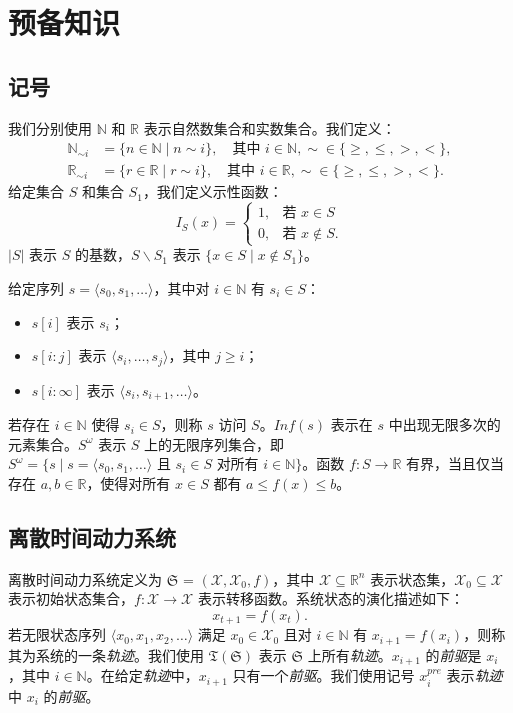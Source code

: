 ﻿\section{预备知识}
\subsection{记号}
\label{notation123}
我们分别使用 \(\mathbb{N}\) 和 \(\mathbb{R}\) 表示自然数集合和实数集合。我们定义：
\begin{align*}
  \mathbb{N}_{\sim i} &= \{n \in \mathbb{N} \mid n \sim i\}, \quad \text{其中 } i \in \mathbb{N}, \sim \in \{\geq, \leq, >, <\}, \\
  \mathbb{R}_{\sim i} &= \{r \in \mathbb{R} \mid r \sim i\}, \quad \text{其中 } i \in \mathbb{R}, \sim \in \{\geq, \leq, >, <\}.
\end{align*}
给定集合 \( S \) 和集合 $S_1$，我们定义示性函数：
$$I_S(x) =
  \begin{cases}
  1, & \text{若 } x \in S \\
  0, & \text{若 } x \not\in S.
  \end{cases}$$
$|S|$ 表示 $S$ 的基数，$S\backslash S_1$ 表示 $\{x \in S \mid x \not\in S_1\}$。

给定序列 \( s = \langle s_0, s_1, \dots \rangle \)，其中对 $i \in \mathbb{N}$ 有 $s_i \in S$：
\begin{itemize}
  \item \( s[i] \) 表示 \( s_i \)；
  \item \( s[i:j] \) 表示 \( \langle s_i, \dots, s_j \rangle \)，其中 \( j \geq i \)；
  \item \( s[i:\infty] \) 表示 \( \langle s_i, s_{i+1}, \dots \rangle \)。
\end{itemize}
若存在 $i \in \mathbb{N}$ 使得 $s_i \in S$，则称 $s$ 访问 $S$。$Inf(s)$ 表示在 $s$ 中出现无限多次的元素集合。$S^{\omega}$ 表示 $S$ 上的无限序列集合，即 $S^{\omega} = \{s \mid s=\langle s_0, s_1, \dots \rangle \text{ 且 } s_i \in S \text{ 对所有 } i \in \mathbb{N}\}$。函数 $f: S \rightarrow \mathbb{R}$ 有界，当且仅当存在 $a, b \in \mathbb{R}$，使得对所有 $x \in S$ 都有 $a \leq f(x) \leq b$。

\subsection{离散时间动力系统}
\label{dtds}
离散时间动力系统定义为 $\mathfrak{S}$ = $(\mathcal{X}, \mathcal{X}_0, f)$，其中 $\mathcal{X} \subseteq \mathbb{R}^n$ 表示状态集，$\mathcal{X}_{0} \subseteq \mathcal{X}$ 表示初始状态集合，$f: \mathcal{X} \rightarrow \mathcal{X}$ 表示转移函数。系统状态的演化描述如下：
\[
  x_{t+1} = f(x_t).
\]
若无限状态序列 $\langle x_0, x_1, x_2, \dots \rangle$ 满足 $x_0 \in \mathcal{X}_0$ 且对 $i \in \mathbb{N}$ 有 $x_{i+1} = f(x_{i})$，则称其为系统的一条\emph{轨迹}。我们使用 $\mathfrak{T}(\mathfrak{S})$ 表示 $\mathfrak{S}$ 上所有\emph{轨迹}。\(x_{i+1}\) 的\emph{前驱}是 \(x_i\)，其中 \(i \in \mathbb{N}\)。在给定\emph{轨迹}中，\(x_{i+1}\) 只有一个\emph{前驱}。我们使用记号 \(x_{i}^{pre}\) 表示\emph{轨迹}中 \(x_{i}\) 的\emph{前驱}。
